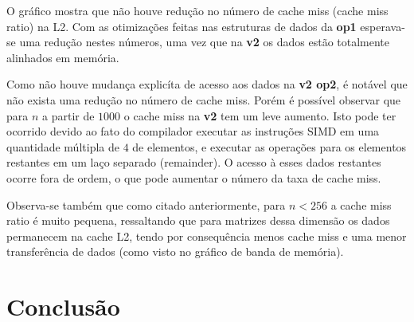 \documentclass[12pt]{article}
\begin{document}
O gráfico mostra que não houve redução no número de cache miss (cache miss ratio) na L2. Com as otimizações feitas nas estruturas de dados da \textbf{op1} esperava-se uma redução nestes números, uma vez que na \textbf{v2} os dados estão totalmente alinhados em memória.

Como não houve mudança explicíta de acesso aos dados na \textbf{v2 op2}, é notável que não exista uma redução no número de cache miss. Porém é possível observar que para $n$ a partir de  $1000$ o cache miss na \textbf{v2} tem um leve aumento. Isto pode ter ocorrido devido ao fato do compilador executar as instruções SIMD em uma quantidade múltipla de $4$ de elementos, e executar as operações para os elementos restantes em um laço separado (remainder). O acesso à esses dados restantes ocorre fora de ordem, o que pode aumentar o número da taxa de cache miss.

Observa-se também que como citado anteriormente, para $n < 256 $ a cache miss ratio é muito pequena, ressaltando que para matrizes dessa dimensão os dados permanecem na cache L2, tendo por consequência menos cache miss e uma menor transferência de dados (como visto no gráfico de banda de memória).

\section{Conclusão}
\end{document}

